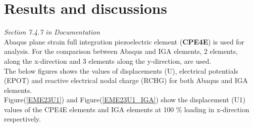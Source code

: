 \documentclass[12pt]{article}
\begin{document}
\section{Results and discussions}
\emph{Section 7.4.7 in Documentation}\\
Abaqus plane strain full integration piezoelectric element (\textbf{CPE4E}) is used for analysis. For the comparison between Abaqus and IGA elements, 2 elements, along the x-direction and 3 elements along the y-direction, are used.\\
The below figures shows the values of displacements (U), electrical potentials (EPOT) and reactive electrical nodal charge (RCHG) for both Abaqus and IGA elements.\\
Figure(\ref{EME23U1}) and Figure(\ref{EME23U1_IGA}) show the displacement (U1) values of the CPE4E elements and IGA elements at 100 \% loading in x-direction respectively. \\
\end{document}
